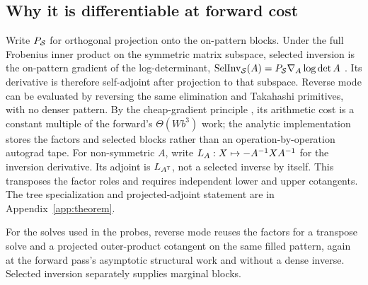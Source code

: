 \subsection{Why it is differentiable at forward cost}
\label{sec:theorem}

\begin{remark}
\label{rem:scaffold}
Write $P_{\mathcal{S}}$ for orthogonal projection onto the on-pattern blocks. Under
the full Frobenius inner product on the symmetric matrix subspace, selected
inversion is the on-pattern gradient of the log-determinant,
$\operatorname{SelInv}_{\mathcal{S}}(A)=P_{\mathcal{S}}\nabla_A\log\det A$
\citep{zhu2019sparse,dwyer1948symbolic}. Its derivative is therefore
self-adjoint after projection to that subspace. Reverse mode can be evaluated
by reversing the same elimination and Takahashi primitives, with no denser
pattern. By the cheap-gradient principle \citep{baur1983complexity}, its
arithmetic cost is a constant multiple of the forward's
$\Theta(Wb^3)$ work; the analytic implementation stores the factors and
selected blocks rather than an operation-by-operation autograd tape. For
non-symmetric $A$, write
$L_A:X\mapsto-A^{-1}XA^{-1}$ for the inversion derivative. Its adjoint is
$L_{A^{\mathsf{T}}}$, not a selected inverse by itself. This transposes the
factor roles and requires independent lower and upper cotangents. The tree
specialization and projected-adjoint statement are in
Appendix~\ref{app:theorem}.
\end{remark}

For the solves used in the probes, reverse mode reuses the factors for a
transpose solve and a projected outer-product cotangent on the same filled
pattern, again at the forward pass's asymptotic structural work and without a
dense inverse. Selected inversion separately supplies marginal blocks.
